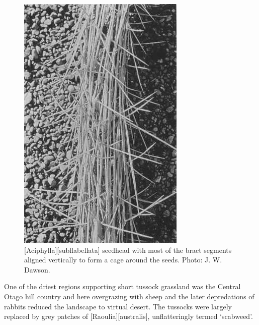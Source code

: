 \begin{figure}[htb]
\begin{minipage}[t]{0.467\textwidth}
    	\includegraphics[width=\textwidth]{graphics/figure85aciphylla-seedhead.jpg}
    	\caption[\emph{Aciphylla subflabellata} seedhead]{[Aciphylla][subflabellata] seedhead with most of the bract segments aligned vertically to form a cage around the seeds.
    	Photo:  J. W. Dawson.}%
    	\label{fig:85aciphylla-seedhead}
	\end{minipage}
\end{figure}

One of the driest regions supporting short tussock grassland was the Central Otago hill country and here overgrazing with sheep and the later depredations of rabbits reduced the landscape to virtual desert.
The tussocks were largely replaced by grey patches of [Raoulia][australis], unflatteringly termed `scabweed'.

